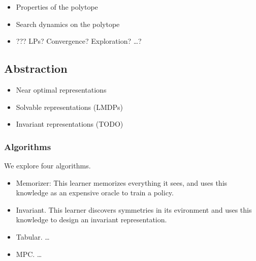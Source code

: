 \begin{itemize}
\tightlist
\item
  Properties of the polytope
\item
  Search dynamics on the polytope
\item
  ??? LPs? Convergence? Exploration? \ldots{}?
\end{itemize}

\hypertarget{abstraction}{%
\subsection{Abstraction}\label{abstraction}}

\begin{itemize}
\tightlist
\item
  Near optimal representations
\item
  Solvable representations (LMDPs)
\item
  Invariant representations (TODO)
\end{itemize}

\hypertarget{algorithms}{%
\subsubsection{Algorithms}\label{algorithms}}

We explore four algorithms.

\begin{itemize}
\tightlist
\item
  Memorizer: This learner memorizes everything it sees, and uses this
  knowledge as an expensive oracle to train a policy.
\item
  Invariant. This learner discovers symmetries in its evironment and
  uses this knowledge to design an invariant representation.
\item
  Tabular. \ldots{}
\item
  MPC. \ldots{}
\end{itemize}
